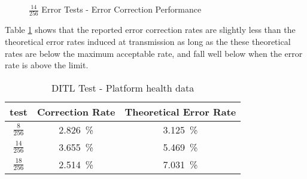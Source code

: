 \begin{figure}[H]
\centering
\caption{$\frac{14}{256}$ Error Tests - Error Correction Performance}
\label{fig:stress-fec}
\end{figure}

Table \ref{tab:stress-fec} shows that the reported error correction rates
are slightly less than the theoretical error rates induced at transmission as
long as the these theoretical rates are below the maximum acceptable rate, and
fall well below when the error rate is above the limit.

\begin{table}[H]
\begin{center}
\begin{tabular}{ |c|c c| }
\hline
test & Correction Rate & Theoretical Error Rate \\
\hline
$\frac{8}{256}$  & \SI{2.826}{\percent} & \SI{3.125}{\percent} \\ [0.2em]
$\frac{14}{256}$ & \SI{3.655}{\percent} & \SI{5.469}{\percent} \\ [0.2em]
$\frac{18}{256}$ & \SI{2.514}{\percent} & \SI{7.031}{\percent} \\ [0.2em]
\hline 
\end{tabular}
\end{center}
\caption {DITL Test - Platform health data}
\label{tab:stress-fec}
\end{table}

